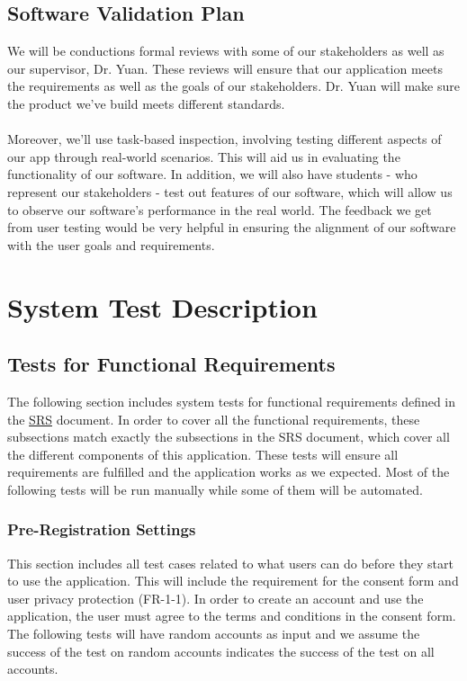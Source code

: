 \documentclass[12pt, titlepage]{article}
\begin{document}
\subsection{Software Validation Plan}

      We will be conductions formal reviews with some of our stakeholders as well as our supervisor, Dr. Yuan. These reviews will ensure that our application meets the requirements as well as the goals of our stakeholders. Dr. Yuan will make sure the product we've build meets different standards.\\\\
      Moreover, we'll use task-based inspection, involving testing different aspects of our app through real-world scenarios. This will aid us in evaluating the functionality of our software. In addition, we will also have students - who represent our stakeholders - test out features of our software, which will allow us to observe our software's performance in the real world. The feedback we get from user testing would be very helpful in ensuring the alignment of our software with the user goals and requirements.    

\section{System Test Description}
\label{sec:system}
	
\subsection{Tests for Functional Requirements}

The following section includes system tests for functional requirements defined in the \href{https://github.com/beatlepie/4G06CapstoneProjectTeam2/blob/main/docs/SRS/SRS.pdf}{SRS} document. In order to cover all the functional requirements, these subsections match exactly the subsections in the SRS document, which cover all the different components of this application. These tests will ensure all requirements are fulfilled and the application works as we expected. Most of the following tests will be run manually while some of them will be automated.

\subsubsection{Pre-Registration Settings}

This section includes all test cases related to what users can do before they start to use the application. This will include the requirement for the consent form and user privacy protection (FR-1-1). In order to create an account and use the application, the user must agree to the terms and conditions in the consent form. The following tests will have random accounts as input and we assume the success of the test on random accounts indicates the success of the test on all accounts.
\end{document}
